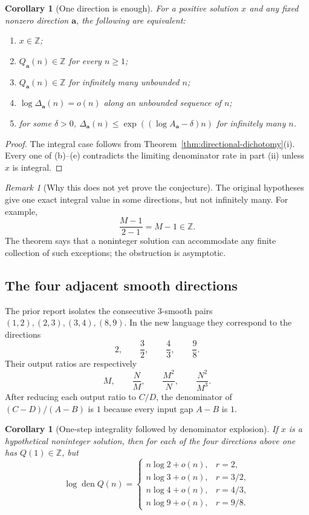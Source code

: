 \documentclass[11pt,oneside]{article}
\newtheorem{corollary}[theorem]{Corollary}
\theoremstyle{definition}
\theoremstyle{remark}
\newtheorem{remark}[theorem]{Remark}
\newcommand{\Z}{\mathbb Z}
\newcommand{\den}{\operatorname{den}}
\begin{document}
\begin{corollary}[One direction is enough]
\label{cor:one-direction}
For a positive solution $x$ and any fixed nonzero direction $\mathbf a$, the following are
equivalent:
\begin{enumerate}[label=\textup{(\alph*)}]
\item $x\in\Z$;
\item $Q_{\mathbf a}(n)\in\Z$ for every $n\ge1$;
\item $Q_{\mathbf a}(n)\in\Z$ for infinitely many unbounded $n$;
\item $\log\Delta_{\mathbf a}(n)=o(n)$ along an unbounded sequence of $n$;
\item for some $\delta>0$,
$\Delta_{\mathbf a}(n)\le\exp((\log A_{\mathbf a}-\delta)n)$ for infinitely many $n$.
\end{enumerate}
\end{corollary}

\begin{proof}
The integral case follows from Theorem~\ref{thm:directional-dichotomy}(i).  Every one of
(b)--(e) contradicts the limiting denominator rate in part (ii) unless $x$ is integral.
\end{proof}

\begin{remark}[Why this does not yet prove the conjecture]
The original hypotheses give one exact integral value in some directions, but not infinitely
many.  For example,
\[
 \frac{M-1}{2-1}=M-1\in\Z.
\]
The theorem says that a noninteger solution can accommodate any finite collection of such
exceptions; the obstruction is asymptotic.
\end{remark}

\subsection{The four adjacent smooth directions}

The prior report isolates the consecutive $3$-smooth pairs
$(1,2),(2,3),(3,4),(8,9)$.  In the new language they correspond to the directions
\[
 2,\qquad \frac32,\qquad\frac43,\qquad\frac98.
\]
Their output ratios are respectively
\[
 M,\qquad\frac NM,\qquad\frac{M^2}{N},\qquad\frac{N^2}{M^3}.
\]
After reducing each output ratio to $C/D$, the denominator of
$(C-D)/(A-B)$ is $1$ because every input gap $A-B$ is $1$.

\begin{corollary}[One-step integrality followed by denominator explosion]
\label{cor:adjacent}
If $x$ is a hypothetical noninteger solution, then for each of the four directions above
one has $Q(1)\in\Z$, but
\[
 \log\den Q(n)=
 \begin{cases}
 n\log2+o(n),&r=2,\\
 n\log3+o(n),&r=3/2,\\
 n\log4+o(n),&r=4/3,\\
 n\log9+o(n),&r=9/8.
 \end{cases}
\]
\end{corollary}
\end{document}
